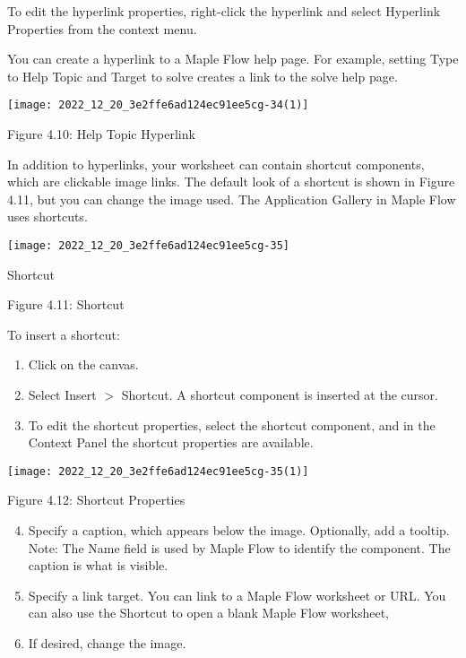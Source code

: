 To edit the hyperlink properties, right-click the hyperlink and select Hyperlink Properties from the context menu.

You can create a hyperlink to a Maple Flow help page. For example, setting Type to Help Topic and Target to solve creates a link to the solve help page.

\begin{center}
\texttt{[image: 2022\_12\_20\_3e2ffe6ad124ec91ee5cg-34(1)]}
\end{center}

Figure 4.10: Help Topic Hyperlink

In addition to hyperlinks, your worksheet can contain shortcut components, which are clickable image links. The default look of a shortcut is shown in Figure 4.11, but you can change the image used. The Application Gallery in Maple Flow uses shortcuts.

\begin{center}
\texttt{[image: 2022\_12\_20\_3e2ffe6ad124ec91ee5cg-35]}
\end{center}

Shortcut

Figure 4.11: Shortcut

To insert a shortcut:

\begin{enumerate}
  \item Click on the canvas.

  \item Select Insert $>$ Shortcut. A shortcut component is inserted at the cursor.

  \item To edit the shortcut properties, select the shortcut component, and in the Context Panel the shortcut properties are available.

\end{enumerate}

\begin{center}
\texttt{[image: 2022\_12\_20\_3e2ffe6ad124ec91ee5cg-35(1)]}
\end{center}

Figure 4.12: Shortcut Properties

\begin{enumerate}
  \setcounter{enumi}{3}
  \item Specify a caption, which appears below the image. Optionally, add a tooltip. Note: The Name field is used by Maple Flow to identify the component. The caption is what is visible.

  \item Specify a link target. You can link to a Maple Flow worksheet or URL. You can also use the Shortcut to open a blank Maple Flow worksheet,

  \item If desired, change the image.

\end{enumerate}

